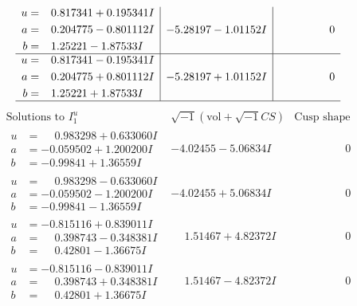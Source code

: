 \documentclass[1p]{elsarticle_modified}
\theoremstyle{definition}
\newcommand{\I}{\sqrt{-1}}
\begin{document}
$$\begin{array}{c|c|c}
\begin{aligned}
u &= \phantom{-}0.817341 + 0.195341 I \\
a &= \phantom{-}0.204775 - 0.801112 I \\
b &= \phantom{-}1.25221 - 1.87533 I\end{aligned}
 & -5.28197 - 1.01152 I & \phantom{-0.000000 } 0 \\ \hline\begin{aligned}
u &= \phantom{-}0.817341 - 0.195341 I \\
a &= \phantom{-}0.204775 + 0.801112 I \\
b &= \phantom{-}1.25221 + 1.87533 I\end{aligned}
 & -5.28197 + 1.01152 I & \phantom{-0.000000 } 0\\
 \hline 
 \end{array}$$\newpage$$\begin{array}{c|c|c}  
\text{Solutions to }I^u_{1}& \I (\text{vol} + \sqrt{-1}CS) & \text{Cusp shape}\\
 \hline 
\begin{aligned}
u &= \phantom{-}0.983298 + 0.633060 I \\
a &= -0.059502 + 1.200200 I \\
b &= -0.99841 + 1.36559 I\end{aligned}
 & -4.02455 - 5.06834 I & \phantom{-0.000000 } 0 \\ \hline\begin{aligned}
u &= \phantom{-}0.983298 - 0.633060 I \\
a &= -0.059502 - 1.200200 I \\
b &= -0.99841 - 1.36559 I\end{aligned}
 & -4.02455 + 5.06834 I & \phantom{-0.000000 } 0 \\ \hline\begin{aligned}
u &= -0.815116 + 0.839011 I \\
a &= \phantom{-}0.398743 - 0.348381 I \\
b &= \phantom{-}0.42801 - 1.36675 I\end{aligned}
 & \phantom{-}1.51467 + 4.82372 I & \phantom{-0.000000 } 0 \\ \hline\begin{aligned}
u &= -0.815116 - 0.839011 I \\
a &= \phantom{-}0.398743 + 0.348381 I \\
b &= \phantom{-}0.42801 + 1.36675 I\end{aligned}
 & \phantom{-}1.51467 - 4.82372 I & \phantom{-0.000000 } 0 \\ \hline\begin{aligned}

\end{aligned}
\end{array}$$
\end{document}
